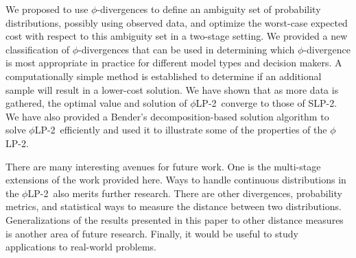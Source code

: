 \documentclass[opre,nonblindrev]{informs3} %
\newcommand{\plp}{$\phi$LP-2}
\begin{document}
We proposed to use $\phi$-divergences
to define an ambiguity set of probability distributions, possibly using observed data, and optimize the worst-case expected cost with respect to this ambiguity set in a two-stage setting.
We provided a new classification of $\phi$-divergences that can be used in determining which $\phi$-divergence is most appropriate in practice for different model types and decision makers.
A computationally simple method is established to determine if an additional sample %
will result in a lower-cost solution.
We have shown that as more data is gathered, the optimal value and solution of \plp\ converge to those of SLP-2. 
We have also provided a Bender's decomposition-based solution algorithm to solve \plp\ efficiently and used it to illustrate some of the properties of the \plp.

There are many interesting avenues for future work. 
One is the multi-stage extensions of the work provided here. 
Ways to handle continuous distributions in the \plp\ also merits further research. 
There are other divergences, probability metrics, and statistical ways to measure the distance between two distributions. 
Generalizations of the results presented in this paper to other distance measures is another area of future research. 
Finally, it would be useful to study applications to real-world problems.

\end{document}
